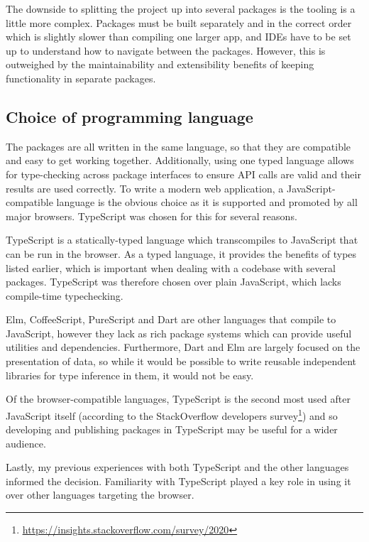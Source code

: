 \documentclass[a4paper,fleqn,oneside,12pt]{report}
\begin{document}
The downside to splitting the project up into several packages is the tooling is a little more complex. Packages must be built separately and in the correct order which is slightly slower than compiling one larger app, and IDEs have to be set up to understand how to navigate between the packages. However, this is outweighed by the maintainability and extensibility benefits of keeping functionality in separate packages.

\subsection{Choice of programming language}\label{id:h.dj2rwwqr30vu}

The packages are all written in the same language, so that they are compatible and easy to get working together. Additionally, using one typed language allows for type-checking across package interfaces to ensure API calls are valid and their results are used correctly. To write a modern web application, a JavaScript-compatible language is the obvious choice as it is supported and promoted by all major browsers. TypeScript was chosen for this for several reasons.

TypeScript is a statically-typed language which transcompiles to JavaScript that can be run in the browser. As a typed language, it provides the benefits of types listed earlier, which is important when dealing with a codebase with several packages. TypeScript was therefore chosen over plain JavaScript, which lacks compile-time typechecking.

Elm, CoffeeScript, PureScript and Dart are other languages that compile to JavaScript, however they lack as rich package systems which can provide useful utilities and dependencies. Furthermore, Dart and Elm are largely focused on the presentation of data, so while it would be possible to write reusable independent libraries for type inference in them, it would not be easy.

Of the browser-compatible languages, TypeScript is the second most used after JavaScript itself (according to the StackOverflow developers survey\footnote{\underline{\href{https://insights.stackoverflow.com/survey/2020\#technology-programming-scripting-and-markup-languages}{https://insights.stackoverflow.com/survey/2020}}}) and so developing and publishing packages in TypeScript may be useful for a wider audience.

Lastly, my previous experiences with both TypeScript and the other languages informed the decision. Familiarity with TypeScript played a key role in using it over other languages targeting the browser.
\end{document}

